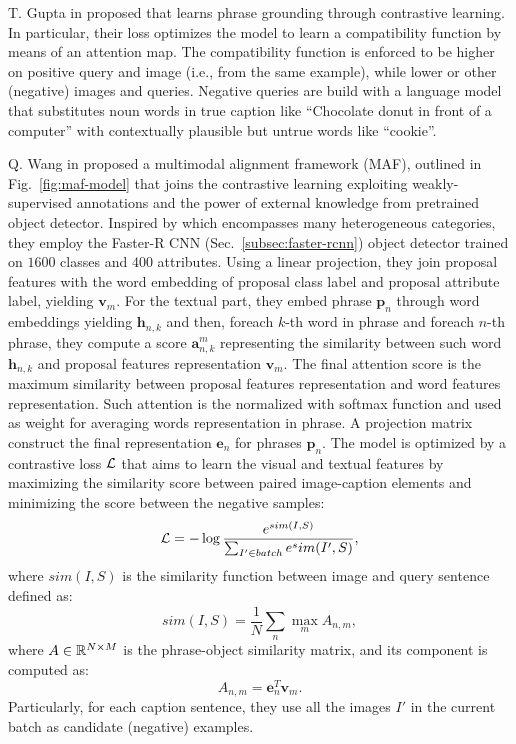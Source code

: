 T. Gupta \etal{} in \cite{gupta2020contrastive} proposed that learns
phrase grounding through contrastive learning. In particular, their
loss optimizes the model to learn a compatibility function by means of
an attention map. The compatibility function is enforced to be higher
on positive query and image (i.e., from the same example), while lower
or other (negative) images and queries. Negative queries are build
with a language model that substitutes noun words in true caption like
``Chocolate donut in front of a computer'' with contextually plausible
but untrue words like ``cookie''.

Q. Wang \etal{} in \cite{wang2020maf} proposed a multimodal alignment
framework (MAF), outlined in Fig.~\ref{fig:maf-model} that joins the
contrastive learning exploiting weakly-supervised annotations and the
power of external knowledge from pretrained object detector. Inspired
by \cite{wang2019phrase} which encompasses many heterogeneous
categories, they employ the Faster-R CNN
(Sec.~\ref{subsec:faster-rcnn}) object detector trained on $1600$
classes and $400$ attributes. Using a linear projection, they join
proposal features with the word embedding of proposal class label and
proposal attribute label, yielding $\bm{v}_m$. For the textual part,
they embed phrase $\bm{p}_n$ through word embeddings yielding
$\bm{h}_{n,k}$ and then, foreach $k$-th word in phrase and foreach
$n$-th phrase, they compute a score $\bm{a}^m_{n,k}$ representing the
similarity between such word $\bm{h}_{n,k}$ and proposal features
representation $\bm{v}_m$. The final attention score is the maximum
similarity between proposal features representation and word features
representation. Such attention is the normalized with softmax function
and used as weight for averaging words representation in phrase. A
projection matrix construct the final representation $\bm{e}_n$ for
phrases $\bm{p}_n$. The model is optimized by a contrastive loss
$\mathcal{L}$ that aims to learn the visual and textual features by
maximizing the similarity score between paired image-caption elements
and minimizing the score between the negative samples:
\begin{equation}
  \mathcal{L} = - \log \frac{e^{sim(I, S)}}{ \sum_{I' \in batch} e^sim(I', S) },
\end{equation}
where $sim(I, S)$ is the similarity function between image and query
sentence defined as:
\begin{equation}
  sim(I, S) = \frac{1}{N} \sum_n \max_m A_{n,m},
\end{equation}
where $A \in \mathbb{R}^{N \times M}$ is the phrase-object similarity
matrix, and its component is computed as:
\begin{equation}
  A_{n,m} = \bm{e}^T_n \bm{v}_m.
\end{equation}
Particularly, for each caption sentence, they use all the images $I′$
in the current batch as candidate (negative) examples.

